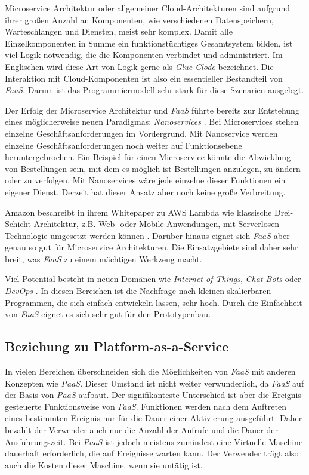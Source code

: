 Microservice Architektur oder allgemeiner Cloud-Architekturen sind aufgrund ihrer großen Anzahl an Komponenten, wie verschiedenen Datenspeichern, Warteschlangen und Diensten, meist sehr komplex. Damit alle Einzelkomponenten in Summe ein funktionstüchtiges Gesamtsystem bilden, ist viel Logik notwendig, die die Komponenten verbindet und administriert. Im Englischen wird diese Art von Logik gerne als \textit{Glue-Clode} bezeichnet. Die Interaktion mit Cloud-Komponenten ist also ein essentieller Bestandteil von \textit{FaaS}. Darum ist das Programmiermodell sehr stark für diese Szenarien ausgelegt.

Der Erfolg der Microservice Architektur und \textit{FaaS} führte bereits zur Entstehung eines möglicherweise neuen Paradigmas: \textit{Nanoservices} \cite{infoqFaaS}. Bei Microservices stehen einzelne Geschäftsanforderungen im Vordergrund. Mit Nanoservice werden einzelne Geschäftsanforderungen noch weiter auf Funktionsebene heruntergebrochen. Ein Beispiel für einen Microservice könnte die Abwicklung von Bestellungen sein, mit dem es möglich ist Bestellungen anzulegen, zu ändern oder zu verfolgen. Mit Nanoservices wäre jede einzelne dieser Funktionen ein eigener Dienst. Derzeit hat dieser Ansatz aber noch keine große Verbreitung.

Amazon beschreibt in ihrem Whitepaper zu AWS Lambda wie klassische Drei-Schicht-Architektur, z.B. Web- oder Mobile-Anwendungen, mit Serverlosen Technologie umgesetzt werden können \cite{AwsMultiTier}. Darüber hinaus eignet sich \textit{FaaS} aber genau so gut für Microservice Architekturen. Die Einsatzgebiete sind daher sehr breit, was \textit{FaaS} zu einem mächtigen Werkzeug macht.

Viel Potential besteht in neuen Domänen wie \textit{Internet of Things}, \textit{Chat-Bots} oder \textit{DevOps} \cite{NewStackAzurePreview}. In diesen Bereichen ist die Nachfrage nach kleinen skalierbaren Programmen, die sich einfach entwickeln lassen, sehr hoch. Durch die Einfachheit von \textit{FaaS} eignet es sich sehr gut für den Prototypenbau.

\subsection{Beziehung zu Platform-as-a-Service}

In vielen Bereichen überschneiden sich die Möglichkeiten von \textit{FaaS} mit anderen Konzepten wie \zB \textit{PaaS}. Dieser Umstand ist nicht weiter verwunderlich, da \textit{FaaS} auf der Basis von \textit{PaaS} aufbaut. Der signifikanteste Unterschied ist aber die Ereignis-gesteuerte Funktionsweise von \textit{FaaS}. Funktionen werden nach dem Auftreten eines bestimmten Ereignis nur für die Dauer einer Aktivierung ausgeführt. Daher bezahlt der Verwender auch nur die Anzahl der Aufrufe und die Dauer der Ausführungszeit. Bei \textit{PaaS} ist jedoch meistens zumindest eine Virtuelle-Maschine dauerhaft erforderlich, die auf Ereignisse warten kann. Der Verwender trägt also auch die Kosten dieser Maschine, wenn sie untätig ist.

